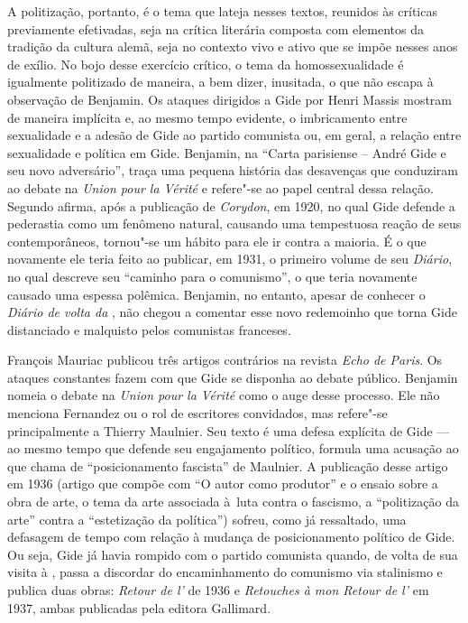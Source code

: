 A politização, portanto, é o tema que lateja nesses textos, reunidos às
críticas previamente efetivadas, seja na crítica literária composta com
elementos da tradição da cultura alemã, seja no contexto vivo e ativo
que se impõe nesses anos de exílio. No bojo desse exercício crítico, o
tema da homossexualidade é igualmente politizado de maneira, a bem
dizer, inusitada, o que não escapa à observação de Benjamin. Os ataques
dirigidos a Gide por Henri Massis mostram de maneira implícita e, ao
mesmo tempo evidente, o imbricamento entre sexualidade e a adesão de
Gide ao partido comunista ou, em geral, a relação entre sexualidade e
política em Gide. Benjamin, na ``Carta parisiense  -- André Gide e seu
novo adversário'', traça uma pequena história das desavenças que
conduziram ao debate na \emph{Union pour la Vérité} e refere"-se ao papel
central dessa relação. Segundo afirma, após a publicação de
\emph{Corydon}, em 1920, no qual Gide defende a pederastia como um
fenômeno natural, causando uma tempestuosa reação de seus
contemporâneos, tornou"-se um hábito para ele ir contra a maioria. É o
que novamente ele teria feito ao publicar, em 1931, o primeiro volume de
seu \emph{Diário}, no qual descreve seu ``caminho para o comunismo'', o
que teria novamente causado uma espessa polêmica. Benjamin, no
entanto, apesar de conhecer o \emph{Diário de volta da }, não
chegou a comentar esse novo redemoinho que torna Gide distanciado e
malquisto pelos comunistas franceses.

François Mauriac publicou três artigos contrários na revista \emph{Echo de
Paris}. Os ataques constantes fazem com que Gide se disponha ao debate
público. Benjamin nomeia o debate na \emph{Union pour la Vérité} como o
auge desse processo. Ele não menciona Fernandez ou o rol de escritores
convidados, mas refere"-se principalmente a Thierry Maulnier. Seu texto é
uma defesa explícita de Gide --- ao mesmo tempo que defende seu
engajamento político, formula uma acusação ao que chama de
``posicionamento fascista'' de Maulnier. A publicação desse artigo em
1936 (artigo que compõe com ``O autor como produtor'' e o ensaio sobre a
obra de arte, o tema da arte associada à~luta contra o fascismo, a
``politização da arte'' contra a ``estetização da política'') sofreu,
como já ressaltado, uma defasagem de tempo com relação à mudança de
posicionamento político de Gide. Ou seja, Gide já havia rompido com o
partido comunista quando, de volta de sua visita à , passa a
discordar do encaminhamento do comunismo via stalinismo e publica duas
obras: \emph{Retour de l'} de 1936 e \emph{Retouches à mon
Retour de l'} em 1937, ambas publicadas pela editora Gallimard.

